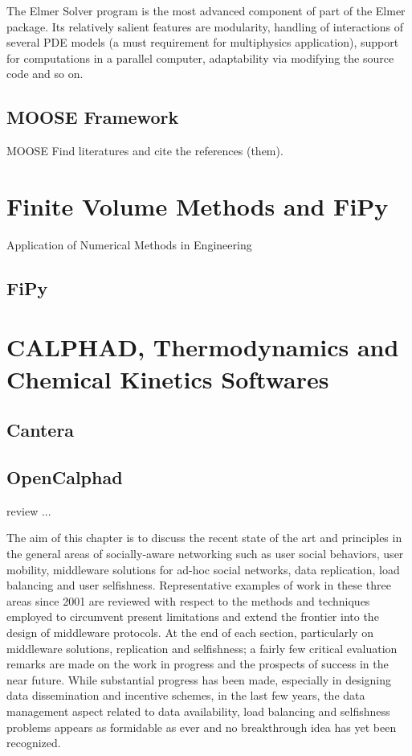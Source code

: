 The Elmer Solver program is the most advanced component of part of the Elmer package. Its relatively salient features are modularity, handling of interactions of several PDE models (a must requirement for multiphysics application), support for computations in a parallel computer, adaptability via modifying the source code and so on.


\subsection{MOOSE Framework}
MOOSE 
Find literatures and cite the references (them).
\section{Finite Volume Methods and FiPy} 
Application of Numerical Methods in Engineering
\subsection{FiPy}

\section{CALPHAD, Thermodynamics and Chemical Kinetics Softwares}
\subsection{Cantera}
\subsection{OpenCalphad}

review
...

The aim of this chapter is to discuss the recent state of the art and principles in the general areas of socially-aware networking such as user social behaviors, user mobility, middleware solutions for ad-hoc social networks, data replication, load balancing and user selfishness. Representative examples of work in these three areas since 2001 are reviewed with respect to the methods and techniques employed to circumvent present limitations and extend the frontier into the design of middleware protocols. At the end of each section, particularly on middleware solutions, replication and selfishness; a fairly few critical evaluation remarks are made on the work in progress and the prospects of success in the near future. While substantial progress has been made, especially in designing data dissemination and incentive schemes, in the last few years, the data management aspect related to data availability, load balancing and selfishness problems appears as formidable as ever and no breakthrough idea has yet been recognized.

